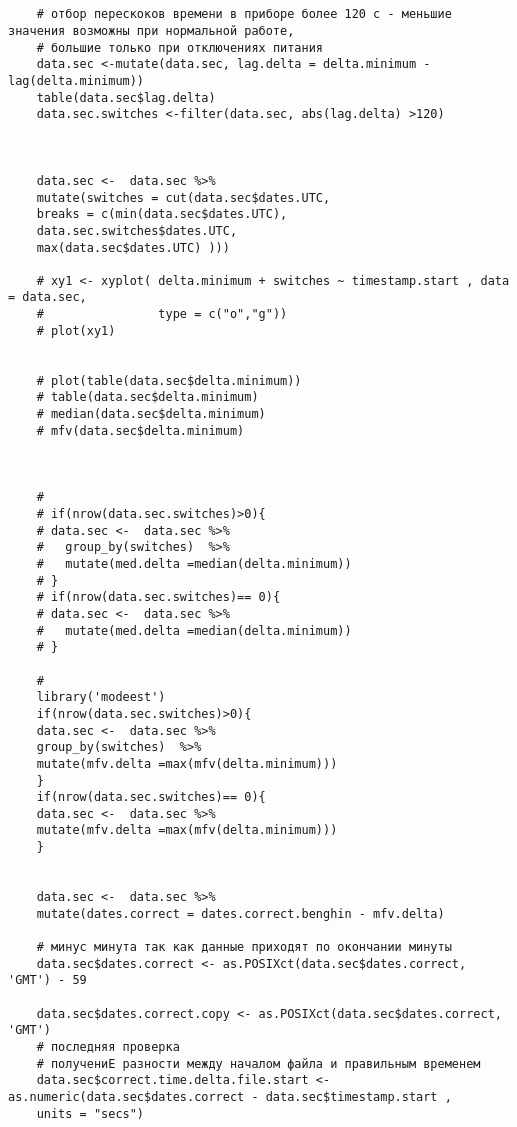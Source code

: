 \begin{ListingEnv}
\begin{lstlisting}[language={Renhanced}]
	
	
	# отбор перескоков времени в приборе более 120 с - меньшие значения возможны при нормальной работе, 
	# большие только при отключениях питания
	data.sec <-mutate(data.sec, lag.delta = delta.minimum - lag(delta.minimum))
	table(data.sec$lag.delta)
	data.sec.switches <-filter(data.sec, abs(lag.delta) >120)
	
	
	
	data.sec <-  data.sec %>%
	mutate(switches = cut(data.sec$dates.UTC, 
	breaks = c(min(data.sec$dates.UTC),
	data.sec.switches$dates.UTC,
	max(data.sec$dates.UTC) )))
	
	# xy1 <- xyplot( delta.minimum + switches ~ timestamp.start , data = data.sec,
	#                type = c("o","g"))
	# plot(xy1)
	
	
	# plot(table(data.sec$delta.minimum))
	# table(data.sec$delta.minimum)
	# median(data.sec$delta.minimum)
	# mfv(data.sec$delta.minimum)
	
	
	
	# 
	# if(nrow(data.sec.switches)>0){
	# data.sec <-  data.sec %>%
	#   group_by(switches)  %>%
	#   mutate(med.delta =median(delta.minimum))
	# }
	# if(nrow(data.sec.switches)== 0){
	# data.sec <-  data.sec %>%
	#   mutate(med.delta =median(delta.minimum))
	# }
	
	# 
	library('modeest')
	if(nrow(data.sec.switches)>0){
	data.sec <-  data.sec %>%
	group_by(switches)  %>%
	mutate(mfv.delta =max(mfv(delta.minimum)))
	}
	if(nrow(data.sec.switches)== 0){
	data.sec <-  data.sec %>%
	mutate(mfv.delta =max(mfv(delta.minimum)))
	}
	
	
	data.sec <-  data.sec %>%
	mutate(dates.correct = dates.correct.benghin - mfv.delta)
	
	# минус минута так как данные приходят по окончании минуты
	data.sec$dates.correct <- as.POSIXct(data.sec$dates.correct, 'GMT') - 59
	
	data.sec$dates.correct.copy <- as.POSIXct(data.sec$dates.correct, 'GMT')
	# последняя проверка
	# получениЕ разности между началом файла и правильным временем
	data.sec$correct.time.delta.file.start <- as.numeric(data.sec$dates.correct - data.sec$timestamp.start ,
	units = "secs")
	\end{lstlisting}
\end{ListingEnv}


